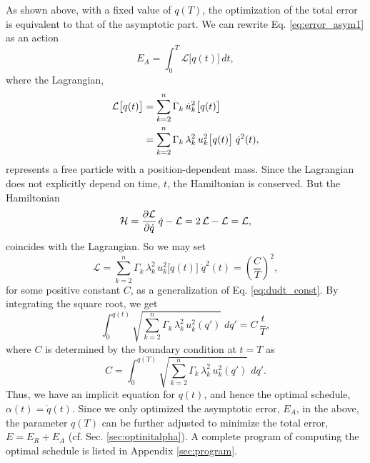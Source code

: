 \documentclass[reprint, floatfix]{revtex4-1}
\newcommand{\Err}{E}
\begin{document}
As shown above, with a fixed value of $q(T)$,
the optimization of the total error is equivalent to
that of the asymptotic part.
%
We can rewrite Eq. \eqref{eq:error_asym1} as an action
%
\begin{equation}
  \Err_A
  =
  \int_0^T
    {\mathcal L} \bigl[ q(t)\bigr]
    \, dt
  ,
\label{eq:error_asym_Lagrangian}
\end{equation}
%
where the Lagrangian,
%
\begin{align}
  {\mathcal L} \bigl[ q(t) \bigr]
  &=
  \sum_{ k = 2 }^n
    \Gamma_k \, \dot u_k^2\bigl[ q(t) \bigr]
  \notag
  \\
  &=
  \sum_{ k = 2 }^n
    \Gamma_k \, \lambda_k^2 \, u_k^2 \bigl[ q(t) \bigr]
  \; \dot q^2( t ),
\notag
\end{align}
%
represents a free particle
with a position-dependent mass.
%
Since the Lagrangian
does not explicitly depend on time, $t$,
the Hamiltonian is conserved.
%
But the Hamiltonian
%
\begin{equation}
  \mathcal H
  =
  \frac{ \partial \mathcal L }
       { \partial \dot q     }
  \, \dot q
  -
  \mathcal L
  =
  2 \, \mathcal L
  - \mathcal L
  =
  \mathcal L,
  \notag
\end{equation}
%
coincides with the Lagrangian.
%
So we may set
%
\begin{equation}
  \mathcal L
  =
    \sum_{ k = 2 }^n
      \Gamma_k \, \lambda_k^2
      \, u_k^2 \bigl[ q(t) \bigr]
  \;
  \dot q^2(t)
  =
  \left(
    \frac C T
  \right)^2
  ,
  \label{eq:Lagrangian_const}
\end{equation}
%
for some positive constant $C$,
%
as a generalization of Eq. \eqref{eq:dudt_const}.
%
By integrating the square root, we get
%
\begin{equation}
  \int_{ 0 }^{ q(t) }
    \sqrt{
      \textstyle\sum_{ k = 2 }^n
        \Gamma_k \, \lambda_k^2
        \, u_k^2( q' )
    }
    \;
    d q'
  =
  C \, \frac t T
  ,
  \label{eq:q_opt}
\end{equation}
%
where $C$ is determined by
the boundary condition at $t = T$ as
%
\begin{equation}
  C =
  \int_{ 0 }^{ q(T) }
    \sqrt{
      \textstyle\sum_{ k = 2 }^n
        \Gamma_k \, \lambda_k^2
        \, u_k^2( q' )
    }
    \;
    d q'
  .
  \label{eq:mint}
\end{equation}
%
Thus, we have an implicit equation for $q(t)$,
and hence the optimal schedule,
$\alpha(t) = \dot q(t)$.
%
Since we only optimized the asymptotic error, $E_A$,
in the above,
the parameter $q(T)$ can be further adjusted
to minimize the total error, $E = E_R + E_A$
(cf. Sec. \ref{sec:optinitalpha}).
%
A complete program of computing the optimal schedule
is listed in Appendix \ref{sec:program}.
\end{document}
